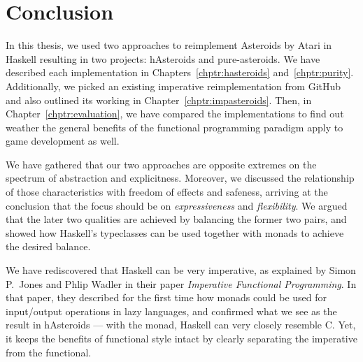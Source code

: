 \documentclass[
  digital, %
  color,   %
  table,   %
  oneside, %
  lof,     %
  lot,     %
]{fithesis3}
\begin{document}
{%





\chapter*{Conclusion}

In this thesis, we used two approaches to reimplement Asteroids by Atari in Haskell
resulting in two projects: hAsteroids and pure-asteroids.
We have described each implementation in Chapters~\ref{chptr:hasteroids} and~\ref{chptr:purity}.
Additionally, we picked an existing imperative reimplementation from GitHub and also
outlined its working in Chapter~\ref{chptr:impasteroids}.
Then, in Chapter~\ref{chptr:evaluation}, we have compared the implementations
to find out weather the general benefits of the functional programming paradigm
apply to game development as well.

We have gathered that our two approaches are opposite extremes on the spectrum
of abstraction and explicitness. Moreover, we discussed the relationship of those
characteristics with freedom of effects and safeness, arriving at the conclusion
that the focus should be on \emph{expressiveness} and \emph{flexibility}.
We argued that the later two qualities are achieved by balancing the former two pairs,
and showed how Haskell's typeclasses can be used together with monads
to achieve the desired balance.

We have rediscovered that Haskell can be very imperative, as explained by Simon P.~Jones
and Phlip Wadler in their paper \textit{Imperative Functional Programming}.\cite{imperativefp}
In that paper, they described for the first time how monads could be used for input/output
operations in lazy languages, and confirmed what we see as the result in hAsteroids --- with the
 monad, Haskell can very closely resemble C. Yet, it keeps the
benefits of functional style intact by clearly separating the imperative from the functional.

}
\end{document}
